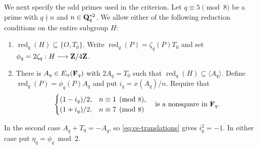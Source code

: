 We next specify the odd primes used in the criterion.  Let $q\equiv5\pmod8$
be a prime with $q\nmid n$ and $n\in\mathbf Q_q^{*2}$.  We allow either of the
following reduction conditions on the entire subgroup $H$:
\begin{enumerate}
\item $\operatorname{red}_q(H)\subseteq\{O,T_0\}$.  Write
 $\operatorname{red}_q(P)=\zeta_q(P)T_0$ and set
 $\phi_q=2\zeta_q:H\longrightarrow\mathbf Z/4\mathbf Z$.
\item There is $A_q\in E_n(\mathbf F_q)$ with $2A_q=T_0$ such that
 $\operatorname{red}_q(H)\subseteq\langle A_q\rangle$.  Define
 $\operatorname{red}_q(P)=\phi_q(P)A_q$ and put $i_q=x(A_q)/n$.
 Require that
 \begin{equation}\label{eq:cs-wrong-unit}
 \begin{cases}(1-i_q)/2,&n\equiv1\pmod8,\\
 (1+i_q)/2,&n\equiv7\pmod8
 \end{cases}
 \quad\text{is a nonsquare in }\mathbf F_q.
 \end{equation}
\end{enumerate}
In the second case $A_q+T_0=-A_q$, so
\eqref{eq:cs-translations} gives $i_q^2=-1$.  In either
case put $\eta_q=\phi_q\bmod2$.

